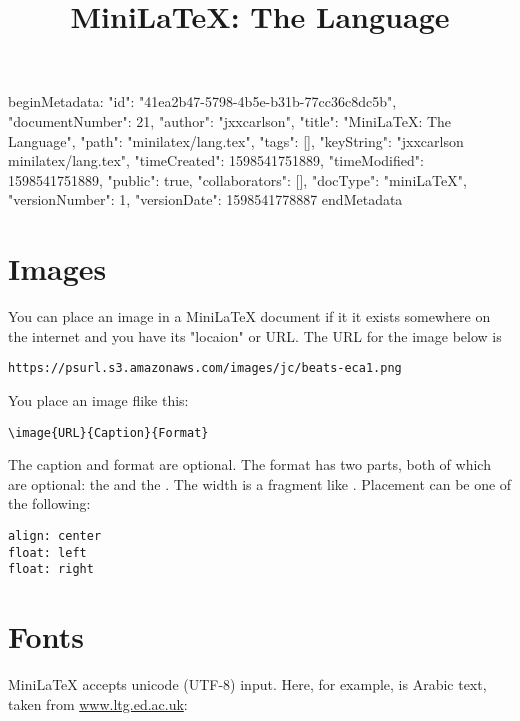 beginMetadata:
{
    "id": "41ea2b47-5798-4b5e-b31b-77cc36c8dc5b",
    "documentNumber": 21,
    "author": "jxxcarlson",
    "title": "MiniLaTeX: The Language",
    "path": "minilatex/lang.tex",
    "tags": [],
    "keyString": "jxxcarlson minilatex/lang.tex",
    "timeCreated": 1598541751889,
    "timeModified": 1598541751889,
    "public": true,
    "collaborators": [],
    "docType": "miniLaTeX",
    "versionNumber": 1,
    "versionDate": 1598541778887
}
endMetadata
\title{MiniLaTeX: The Language}

\maketitle

\tableofcontents


\section{Images}

You can place an image in a MiniLaTeX document if it it exists somewhere on the internet and you have its "locaion" or URL.  The URL for the image below is 

\begin{verbatim}
https://psurl.s3.amazonaws.com/images/jc/beats-eca1.png
\end{verbatim}

You place an image flike this:

\begin{verbatim}
\image{URL}{Caption}{Format}
\end{verbatim}

The caption and format are optional.  The format has two parts, both of which are optional: the  and the . The width is a fragment like .  Placement can be one of the following:

\begin{verbatim}
align: center
float: left
float: right
\end{verbatim}


\section{Fonts}

MiniLaTeX accepts unicode (UTF-8) input.  Here, for example, is Arabic text,  taken from \href{https://www.ltg.ed.ac.uk/~richard/unicode-sample.html}{www.ltg.ed.ac.uk}:

